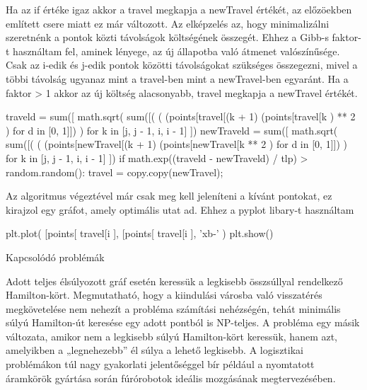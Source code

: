Ha az if értéke igaz akkor a travel megkapja a newTravel értékét, az előzöekben említett csere miatt ez már változott. Az elképzelés az, hogy minimalizálni szeretnénk a pontok közti távolságok költségének összegét. Ehhez a Gibb-s faktor-t használtam fel, aminek lényege, az új állapotba való átmenet valószínűsége. Csak az i-edik és j-edik pontok közötti távolságokat szükséges összegezni, mivel a többi távolság ugyanaz mint a travel-ben mint a newTravel-ben egyaránt. Ha a faktor > 1 akkor az új költség alacsonyabb, travel megkapja a newTravel értékét.


\begin{python}
traveld = sum([
	math.sqrt(
		sum([(
			(
			  (points[travel[(k + 1) %
			  (points[travel[k %
			) **  2
		) for d in [0, 1]])
	) for k in [j, j - 1, i, i - 1]
])
newTraveld = sum([
	math.sqrt(
		sum([(
			(
			  (points[newTravel[(k + 1) %
			  (points[newTravel[k %
			** 2
		) for d in [0, 1]])
	) for k in [j, j - 1, i, i - 1]
])
    if math.exp((traveld - newTraveld) / tlp) > random.random():
        travel = copy.copy(newTravel);
\end{python}        


Az algoritmus végeztével már csak meg kell jeleníteni a kívánt pontokat, ez kirajzol egy gráfot, amely optimális utat ad. Ehhez a pyplot libary-t használtam


\begin{python}
plt.plot(
	[points[
		travel[i %
	], 
	[points[
		travel[i %
	], 
	'xb-'
)
plt.show()
\end{python}

Kapcsolódó problémák

Adott teljes élsúlyozott gráf esetén keressük a legkisebb összsúllyal rendelkező Hamilton-kört. Megmutatható, hogy a kiindulási városba való visszatérés megkövetelése nem nehezít a probléma számítási nehézségén, tehát minimális súlyú Hamilton-út keresése egy adott pontból is NP-teljes.
A probléma egy másik változata, amikor nem a legkisebb súlyú Hamilton-kört keressük, hanem azt, amelyikben a „legnehezebb” él súlya a lehető legkisebb. A logisztikai problémákon túl nagy gyakorlati jelentőséggel bír például a nyomtatott áramkörök gyártása során fúrórobotok ideális mozgásának megtervezésében.



